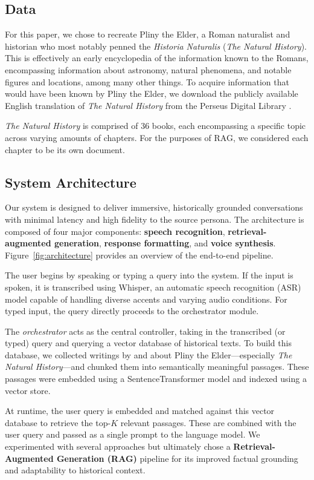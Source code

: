 \documentclass[sigconf]{aamas}
\begin{document}
\subsection{Data}

For this paper, we chose to recreate Pliny the Elder, a Roman naturalist and historian who most notably penned the \textit{Historia Naturalis} (\textit{The Natural History}). This is effectively an early encyclopedia of the information known to the Romans, encompassing information about astronomy, natural phenomena, and notable figures and locations, among many other things. To acquire information that would have been known by Pliny the Elder, we download the publicly available English translation of \textit{The Natural History} \cite{NaturalHistory} from the Perseus Digital Library \cite{Perseus}. 

\textit{The Natural History} is comprised of 36 books, each encompassing a specific topic across varying amounts of chapters. For the purposes of RAG, we considered each chapter to be its own document.

\subsection{System Architecture}

Our system is designed to deliver immersive, historically grounded conversations with minimal latency and high fidelity to the source persona. The architecture is composed of four major components: \textbf{speech recognition}, \textbf{retrieval-augmented generation}, \textbf{response formatting}, and \textbf{voice synthesis}. Figure~\ref{fig:architecture} provides an overview of the end-to-end pipeline.

The user begins by speaking or typing a query into the system. If the input is spoken, it is transcribed using Whisper, an automatic speech recognition (ASR) model capable of handling diverse accents and varying audio conditions. For typed input, the query directly proceeds to the orchestrator module.

The \textit{orchestrator} acts as the central controller, taking in the transcribed (or typed) query and querying a vector database of historical texts. To build this database, we collected writings by and about Pliny the Elder—especially \textit{The Natural History}—and chunked them into semantically meaningful passages. These passages were embedded using a SentenceTransformer model and indexed using a vector store.

At runtime, the user query is embedded and matched against this vector database to retrieve the top-$K$ relevant passages. These are combined with the user query and passed as a single prompt to the language model. We experimented with several approaches but ultimately chose a \textbf{Retrieval-Augmented Generation (RAG)} pipeline for its improved factual grounding and adaptability to historical context.
\end{document}
